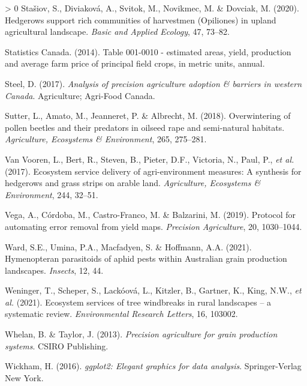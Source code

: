\documentclass[]{elsarticle} %
\newlength{\cslhangindent}
\newenvironment{CSLReferences}[3] %
 {%
  \setlength{\parindent}{0pt}
  \ifodd #1 \everypar{\setlength{\hangindent}{\cslhangindent}}\ignorespaces\fi
  \ifnum #2 > 0
  \setlength{\parskip}{#2\baselineskip}
  \fi
 }%
 {}
\begin{document}
\begin{CSLReferences}{1}{0}
\leavevmode\hypertarget{ref-stasiov2020}{}%
Stašiov, S., Diviaková, A., Svitok, M., Novikmec, M. \& Dovciak, M. (2020). Hedgerows support rich communities of harvestmen ({Opiliones}) in upland agricultural landscape. \emph{Basic and Applied Ecology}, 47, 73--82.

\leavevmode\hypertarget{ref-statscan_canola2014}{}%
Statistics Canada. (2014). Table 001-0010 - estimated areas, yield, production and average farm price of principal field crops, in metric units, annual.

\leavevmode\hypertarget{ref-steel2017}{}%
Steel, D. (2017). \emph{Analysis of precision agriculture adoption \& barriers in western {Canada}}. Agriculture; Agri-Food Canada.

\leavevmode\hypertarget{ref-sutter2018b}{}%
Sutter, L., Amato, M., Jeanneret, P. \& Albrecht, M. (2018). Overwintering of pollen beetles and their predators in oilseed rape and semi-natural habitats. \emph{Agriculture, Ecosystems {\&} Environment}, 265, 275--281.

\leavevmode\hypertarget{ref-vanVooren2017}{}%
Van Vooren, L., Bert, R., Steven, B., Pieter, D.F., Victoria, N., Paul, P., \emph{et al.} (2017). Ecosystem service delivery of agri-environment measures: A synthesis for hedgerows and grass strips on arable land. \emph{Agriculture, Ecosystems {\&} Environment}, 244, 32--51.

\leavevmode\hypertarget{ref-vega2019}{}%
Vega, A., Córdoba, M., Castro-Franco, M. \& Balzarini, M. (2019). Protocol for automating error removal from yield maps. \emph{Precision Agriculture}, 20, 1030--1044.

\leavevmode\hypertarget{ref-ward2021}{}%
Ward, S.E., Umina, P.A., Macfadyen, S. \& Hoffmann, A.A. (2021). Hymenopteran parasitoids of aphid pests within {Australian} grain production landscapes. \emph{Insects}, 12, 44.

\leavevmode\hypertarget{ref-weninger2021}{}%
Weninger, T., Scheper, S., Lackóová, L., Kitzler, B., Gartner, K., King, N.W., \emph{et al.} (2021). Ecosystem services of tree windbreaks in rural landscapes -- a systematic review. \emph{Environmental Research Letters}, 16, 103002.

\leavevmode\hypertarget{ref-whelan2013}{}%
Whelan, B. \& Taylor, J. (2013). \emph{Precision agriculture for grain production systems}. CSIRO Publishing.

\leavevmode\hypertarget{ref-wickham2016}{}%
Wickham, H. (2016). \emph{{ggplot2}: Elegant graphics for data analysis}. Springer-Verlag New York.


\end{CSLReferences}
\end{document}
